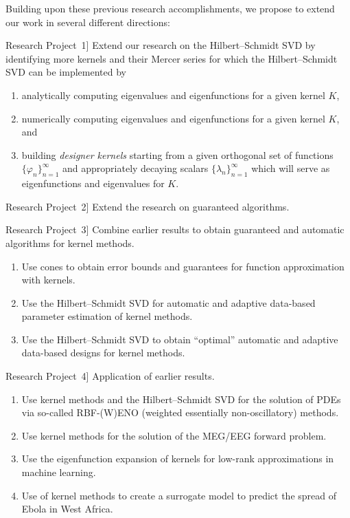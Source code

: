 \documentclass[11pt]{NSFamsart}
\newcommand{\refproba}{\hyperref[SectHSSVD]{Research Project~1}}
\newcommand{\refprobb}{\hyperref[SectGAIL]{Research Project~2}}
\newcommand{\refprobc}{\hyperref[combinesec]{Research Project~3}}
\newcommand{\refprobd}{\hyperref[appsec]{Research Project~4}}
\begin{document}
Building upon these previous research accomplishments, we propose to extend our work in several different directions:

\begin{description}[leftmargin=2.5ex]

\item[\refproba] Extend our research on the Hilbert--Schmidt SVD by identifying more kernels and their Mercer series for which the Hilbert--Schmidt SVD can be implemented by
\begin{enumerate}
\renewcommand{\labelenumi}{1.\arabic{enumi}.}
\item analytically computing eigenvalues and eigenfunctions for a given kernel $K$,
\item numerically computing eigenvalues and eigenfunctions for a given kernel $K$, and
\item building \emph{designer kernels} starting from a given orthogonal set of functions $\{\varphi_n\}_{n=1}^\infty$ and appropriately decaying scalars $\{\lambda_n\}_{n=1}^\infty$ which will serve as eigenfunctions and eigenvalues for $K$.
\end{enumerate}

\item[\refprobb] Extend the research on guaranteed algorithms.

\item[\refprobc] Combine earlier results to obtain guaranteed and automatic algorithms for kernel methods.
\begin{enumerate}
\renewcommand{\labelenumi}{3.\arabic{enumi}.}
\item Use cones to obtain error bounds and guarantees for function approximation with kernels.
\item Use the Hilbert--Schmidt SVD for automatic and adaptive data-based parameter estimation of kernel methods.
\item Use the Hilbert--Schmidt SVD to obtain ``optimal'' automatic and adaptive data-based designs for kernel methods.
\end{enumerate}

\item[\refprobd] Application of earlier results.
\begin{enumerate}
\renewcommand{\labelenumi}{4.\arabic{enumi}.}
\item Use kernel methods and the Hilbert--Schmidt SVD for the solution of PDEs via so-called RBF-(W)ENO (weighted essentially non-oscillatory) methods.
\item Use kernel methods for the solution of the MEG/EEG forward problem.
\item Use the eigenfunction expansion of kernels for low-rank approximations in machine learning.
\item Use of kernel methods to create a surrogate model to predict the spread of Ebola in West Africa.
\end{enumerate}
\end{description}
\end{document}
